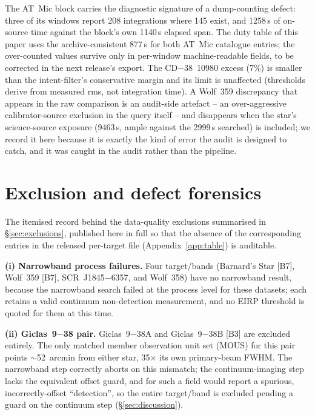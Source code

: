 \documentclass{openjournal}
\begin{document}
The AT~Mic block carries the diagnostic signature of a dump-counting
defect: three of its windows report 208 integrations where 145 exist,
and 1258\,s of on-source time against the block's own 1140\,s elapsed
span. The duty table of this paper uses the archive-consistent 877\,s
for both AT~Mic catalogue entries; the over-counted values survive
only in per-window machine-readable fields, to be corrected in the
next release's export. The CD$-$38~10980 excess (7\%) is smaller than
the intent-filter's conservative margin and its limit is unaffected
(thresholds derive from measured rms, not integration time). A
Wolf~359 discrepancy that appears in the raw comparison is an
audit-side artefact -- an over-aggressive calibrator-source exclusion
in the query itself -- and disappears when the star's science-source
exposure (9463\,s, ample against the 2999\,s searched) is included;
we record it here because it is exactly the kind of error the audit
is designed to catch, and it was caught in the audit rather than the
pipeline.

\section{Exclusion and defect forensics}
\label{app:exclusions}

The itemised record behind the data-quality exclusions summarised in
\S\ref{sec:exclusions}, published here in full so that the absence of
the corresponding entries in the released per-target file (Appendix~\ref{app:table}) is auditable.

\textbf{(i) Narrowband process failures.} Four target/bands
(Barnard's Star [B7], Wolf~359 [B7], SCR~J1845$-$6357, and Wolf~358)
have no narrowband result, because the narrowband search failed at the
process level for these datasets; each retains a valid continuum
non-detection measurement, and no EIRP threshold is quoted for them at
this time.

\textbf{(ii) Giclas~9$-$38 pair.} Giclas~9$-$38A and
Giclas~9$-$38B [B3] are excluded entirely. The only matched member
observation unit set (MOUS) for this pair points $\sim$52~arcmin from
either star, 35$\times$ its own primary-beam FWHM. The narrowband step
correctly aborts on this mismatch; the continuum-imaging step lacks
the equivalent offset guard, and for such a field would report a
spurious, incorrectly-offset ``detection'', so the entire target/band
is excluded pending a guard on the continuum step
(\S\ref{sec:discussion}).
\end{document}
